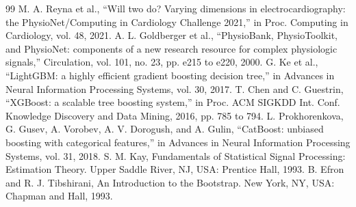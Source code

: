 \documentclass[conference,a4paper]{IEEEtran}
\begin{document}
\begin{thebibliography}{99}
 M. A. Reyna et al., ``Will two do? Varying dimensions in electrocardiography: the PhysioNet/Computing in Cardiology Challenge 2021,'' in Proc. Computing in Cardiology, vol. 48, 2021.
 A. L. Goldberger et al., ``PhysioBank, PhysioToolkit, and PhysioNet: components of a new research resource for complex physiologic signals,'' Circulation, vol. 101, no. 23, pp. e215 to e220, 2000.
 G. Ke et al., ``LightGBM: a highly efficient gradient boosting decision tree,'' in Advances in Neural Information Processing Systems, vol. 30, 2017.
 T. Chen and C. Guestrin, ``XGBoost: a scalable tree boosting system,'' in Proc. ACM SIGKDD Int. Conf. Knowledge Discovery and Data Mining, 2016, pp. 785 to 794.
 L. Prokhorenkova, G. Gusev, A. Vorobev, A. V. Dorogush, and A. Gulin, ``CatBoost: unbiased boosting with categorical features,'' in Advances in Neural Information Processing Systems, vol. 31, 2018.
 S. M. Kay, Fundamentals of Statistical Signal Processing: Estimation Theory. Upper Saddle River, NJ, USA: Prentice Hall, 1993.
 B. Efron and R. J. Tibshirani, An Introduction to the Bootstrap. New York, NY, USA: Chapman and Hall, 1993.
\end{thebibliography}
\end{document}
